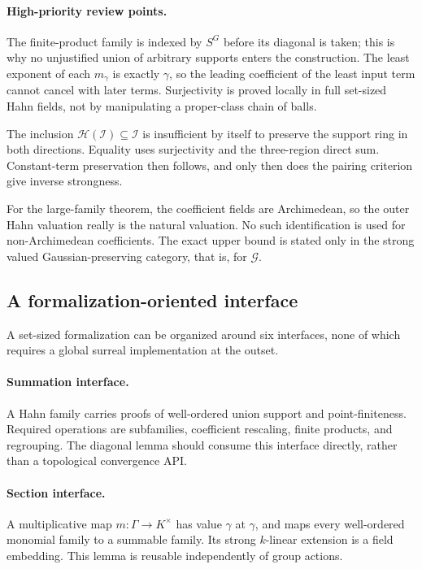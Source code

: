 \documentclass[11pt]{article}
\theoremstyle{definition}
\theoremstyle{remark}
\newcommand{\Ineg}{\mathcal I}
\numberwithin{equation}{section}
\begin{document}
\paragraph{High-priority review points.}
The finite-product family is indexed by $S^G$ before its diagonal is taken; this is
why no unjustified union of arbitrary supports enters the construction. The least
exponent of each $m_\gamma$ is exactly $\gamma$, so the leading coefficient of the
least input term cannot cancel with later terms. Surjectivity is proved locally in
full set-sized Hahn fields, not by manipulating a proper-class chain of balls.

The inclusion $\mathcal H(\Ineg)\subseteq\Ineg$ is insufficient by itself to preserve
the support ring in both directions. Equality uses surjectivity and the three-region
direct sum. Constant-term preservation then follows, and only then does the pairing
criterion give inverse strongness.

For the large-family theorem, the coefficient fields are Archimedean, so the outer
Hahn valuation really is the natural valuation. No such identification is used for
non-Archimedean coefficients. The exact upper bound is stated only in the strong
valued Gaussian-preserving category, that is, for $\mathcal G$.

\subsection{A formalization-oriented interface}

A set-sized formalization can be organized around six interfaces, none of which
requires a global surreal implementation at the outset.

\paragraph{Summation interface.} A Hahn family carries proofs of well-ordered union
support and point-finiteness. Required operations are subfamilies, coefficient
rescaling, finite products, and regrouping. The diagonal lemma should consume this
interface directly, rather than a topological convergence API.

\paragraph{Section interface.} A multiplicative map $m:\Gamma\to K^\times$ has value
$\gamma$ at $\gamma$, and maps every well-ordered monomial family to a summable family.
Its strong $k$-linear extension is a field embedding. This lemma is reusable
independently of group actions.
\end{document}
